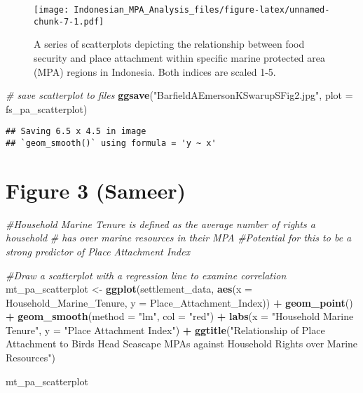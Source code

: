 \documentclass[
]{article}
\newenvironment{Shaded}{\begin{snugshade}}{\end{snugshade}}
\newcommand{\AttributeTok}[1]{\textcolor[rgb]{0.13,0.29,0.53}{#1}}
\newcommand{\CommentTok}[1]{\textcolor[rgb]{0.56,0.35,0.01}{\textit{#1}}}
\newcommand{\FunctionTok}[1]{\textcolor[rgb]{0.13,0.29,0.53}{\textbf{#1}}}
\newcommand{\NormalTok}[1]{#1}
\newcommand{\OtherTok}[1]{\textcolor[rgb]{0.56,0.35,0.01}{#1}}
\newcommand{\SpecialCharTok}[1]{\textcolor[rgb]{0.81,0.36,0.00}{\textbf{#1}}}
\newcommand{\StringTok}[1]{\textcolor[rgb]{0.31,0.60,0.02}{#1}}
\begin{document}
\begin{figure}
\centering
\texttt{[image: Indonesian\_MPA\_Analysis\_files/figure-latex/unnamed-chunk-7-1.pdf]}
\caption{A series of scatterplots depicting the relationship between
food security and place attachment within specific marine protected area
(MPA) regions in Indonesia. Both indices are scaled 1-5.}
\end{figure}

\begin{Shaded}
\begin{Highlighting}[]
\CommentTok{\# save scatterplot to files }
\FunctionTok{ggsave}\NormalTok{(}\StringTok{"BarfieldAEmersonKSwarupSFig2.jpg"}\NormalTok{, }\AttributeTok{plot =}\NormalTok{ fs\_pa\_scatterplot)}
\end{Highlighting}
\end{Shaded}

\begin{verbatim}
## Saving 6.5 x 4.5 in image
## `geom_smooth()` using formula = 'y ~ x'
\end{verbatim}

\section{Figure 3 (Sameer)}\label{figure-3-sameer}

\begin{Shaded}
\begin{Highlighting}[]
\CommentTok{\#Household Marine Tenure is defined as the average number of rights a household}
\CommentTok{\# has over marine resources in their MPA}
\CommentTok{\#Potential for this to be a strong predictor of Place Attachment Index}

\CommentTok{\#Draw a scatterplot with a regression line to examine correlation}
\NormalTok{mt\_pa\_scatterplot }\OtherTok{\textless{}{-}} \FunctionTok{ggplot}\NormalTok{(settlement\_data, }\FunctionTok{aes}\NormalTok{(}\AttributeTok{x =}\NormalTok{ Household\_Marine\_Tenure, }
                                                 \AttributeTok{y =}\NormalTok{ Place\_Attachment\_Index)) }\SpecialCharTok{+}
  \FunctionTok{geom\_point}\NormalTok{() }\SpecialCharTok{+}
  \FunctionTok{geom\_smooth}\NormalTok{(}\AttributeTok{method =} \StringTok{"lm"}\NormalTok{, }\AttributeTok{col =} \StringTok{"red"}\NormalTok{) }\SpecialCharTok{+}
  \FunctionTok{labs}\NormalTok{(}\AttributeTok{x =} \StringTok{"Household Marine Tenure"}\NormalTok{,}
       \AttributeTok{y =} \StringTok{"Place Attachment Index"}\NormalTok{) }\SpecialCharTok{+}
  \FunctionTok{ggtitle}\NormalTok{(}\StringTok{"Relationship of Place Attachment to Bird\textquotesingle{}s Head Seascape MPAs against }
\StringTok{          Household Rights over Marine Resources"}\NormalTok{)}

\NormalTok{mt\_pa\_scatterplot}
\end{Highlighting}
\end{Shaded}
\end{document}
